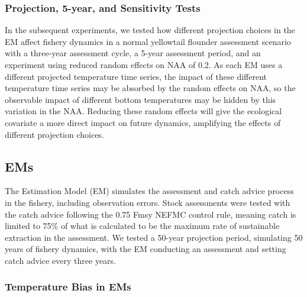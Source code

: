 \documentclass[
  12pt,
]{article}
\begin{document}
\subsubsection{Projection, 5-year, and Sensitivity Tests}\label{projection-5-year-and-sensitivity-tests}

In the subsequent experiments, we tested how different projection choices in the EM affect fishery dynamics in a normal yellowtail flounder assessment scenario with a three-year assessment cycle, a 5-year assessment period, and an experiment using reduced random effects on NAA of 0.2. As each EM uses a different projected temperature time series, the impact of these different temperature time series may be absorbed by the random effects on NAA, so the observable impact of different bottom temperatures may be hidden by this variation in the NAA. Reducing these random effects will give the ecological covariate a more direct impact on future dynamics, amplifying the effects of different projection choices.

\subsection{EMs}\label{ems}

The Estimation Model (EM) simulates the assessment and catch advice process in the fishery, including observation errors. Stock assessments were tested with the catch advice following the 0.75 Fmsy NEFMC control rule, meaning catch is limited to 75\% of what is calculated to be the maximum rate of sustainable extraction in the assessment. We tested a 50-year projection period, simulating 50 years of fishery dynamics, with the EM conducting an assessment and setting catch advice every three years.

\subsubsection{Temperature Bias in EMs}\label{temperature-bias-in-ems}
\end{document}
